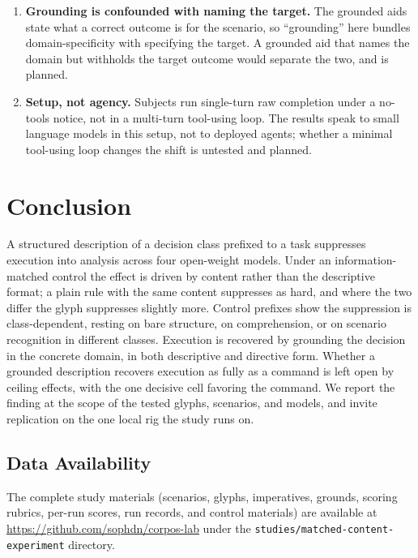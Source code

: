 \documentclass[11pt,a4paper]{article}
\begin{document}
\begin{enumerate}
    control is planned.
  \item \textbf{Grounding is confounded with naming the target.} The grounded aids
    state what a correct outcome is for the scenario, so ``grounding'' here bundles
    domain-specificity with specifying the target. A grounded aid that names the domain
    but withholds the target outcome would separate the two, and is planned.
  \item \textbf{Setup, not agency.} Subjects run single-turn raw completion under a
    no-tools notice, not in a multi-turn tool-using loop. The results speak to small
    language models in this setup, not to deployed agents; whether a minimal tool-using
    loop changes the shift is untested and planned.
\end{enumerate}

\section{Conclusion}

A structured description of a decision class prefixed to a task suppresses execution
into analysis across four open-weight models. Under an information-matched control the
effect is driven by content rather than the descriptive format; a plain rule with the
same content suppresses as hard, and where the two differ the glyph suppresses slightly
more. Control prefixes show the suppression is class-dependent, resting
on bare structure, on comprehension, or on scenario recognition in different classes.
Execution is recovered by grounding the decision in the concrete domain, in both
descriptive and directive form. Whether a grounded description recovers execution as
fully as a command is left open by ceiling effects, with the one decisive cell
favoring the command. We report the finding at the scope of the tested glyphs,
scenarios, and models, and invite replication on the one local rig the study runs on.

\subsection{Data Availability}

The complete study materials (scenarios, glyphs, imperatives, grounds, scoring
rubrics, per-run scores, run records, and control materials) are available at
\url{https://github.com/sophdn/corpos-lab} under the
\texttt{studies/matched-content-experiment} directory.


\end{document}
